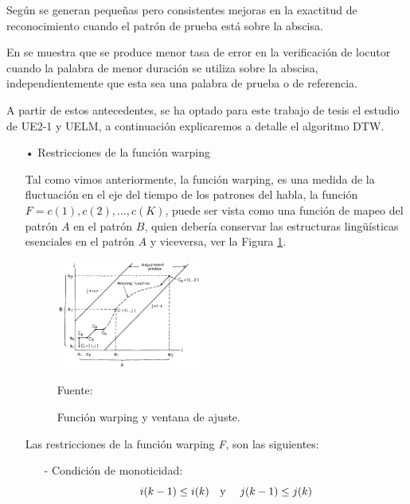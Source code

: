 \begin{enumerate}
Según \cite{rabiner3} se generan pequeñas pero consistentes mejoras en la exactitud de reconocimiento cuando el patrón de prueba está sobre la abscisa.

\vskip 0.5cm
En \citep{furui} se muestra que se produce menor tasa de error en la verificación de locutor cuando la palabra de menor duración se utiliza sobre la abscisa, independientemente que esta sea una palabra de prueba o de referencia.

\vskip 0.5cm
A partir de estos antecedentes, se ha optado para este trabajo de tesis el estudio de UE2-1 y UELM, a continuación explicaremos a detalle el algoritmo DTW.

\begin{enumerate}
\item[•]Restricciones de la función warping
\par
Tal como vimos anteriormente, la función warping, es una medida de la fluctuación en el eje del tiempo de los patrones del habla, la función $F = c(1), c(2),..., c(K)$, puede ser vista como una función de mapeo del patrón $A$ en el patrón $B$, quien debería conservar las estructuras lingüísticas esenciales en el patrón $A$ y viceversa, ver la Figura \ref{fig:figura2.52}.
\begin{figure}[H]
\begin{center}
\includegraphics[width=0.45\textwidth]{Imagenes/Cap2/image053}
\end{center}
\begin{center}
\vskip -0.5cm
\caption{\small{Función warping y ventana de ajuste.}}
\label{fig:figura2.52}
{\small{Fuente: \cite{sakoe}}}
\end{center}
\end{figure}

Las restricciones de la función warping \textit{F}, son las siguientes:
\begin{enumerate}
\item[-]Condición de monoticidad:
\begin{equation}
\label{eq:ecuacion80}
i(k - 1) \leq i(k)
\text{\quad y \quad}
j(k - 1) \leq j(k)
\end{equation}


\end{enumerate}
\end{enumerate}
\end{enumerate}
